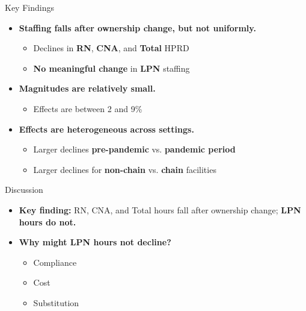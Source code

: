 \documentclass{beamer}
\begin{document}
\begin{frame}[t]{Key Findings}

\small
\begin{itemize}[<+->]
	\setlength{\itemsep}{0.85em}
	\item \textbf{Staffing falls after ownership change, but not uniformly.}
	
	\begin{itemize}
		\setlength{\itemsep}{0.2em}
		\item Declines in \textbf{RN}, \textbf{CNA}, and \textbf{Total} HPRD
		\item \textbf{No meaningful change} in \textbf{LPN} staffing
	\end{itemize}

	\vspace{0.35em}
	\item \textbf{Magnitudes are relatively small.}
	
	\begin{itemize}
		\setlength{\itemsep}{0.2em}
		\item Effects are between 2 and 9\%
	\end{itemize}

	\vspace{0.35em}
	\item \textbf{Effects are heterogeneous across settings.}
  
	\begin{itemize}
		\setlength{\itemsep}{0.2em}
		\item Larger declines \textbf{pre-pandemic} vs. \textbf{pandemic period}
		\item Larger declines for \textbf{non-chain} vs. \textbf{chain} facilities
	\end{itemize}

\end{itemize}
\end{frame}

\begin{frame}[t]{Discussion}

\small
\begin{itemize}
	\setlength{\itemsep}{0.8em}
	\item \textbf{Key finding:} RN, CNA, and Total hours fall after ownership change; \textbf{LPN hours do not.}

	\vspace{0.3em}
	\item \textbf{Why might LPN hours not decline?}
	
	\begin{itemize}
		\setlength{\itemsep}{0.2em}
		\item Compliance %
		\item Cost %
		\item Substitution %
	\end{itemize}
	
\end{itemize}
\end{frame}
\end{document}

